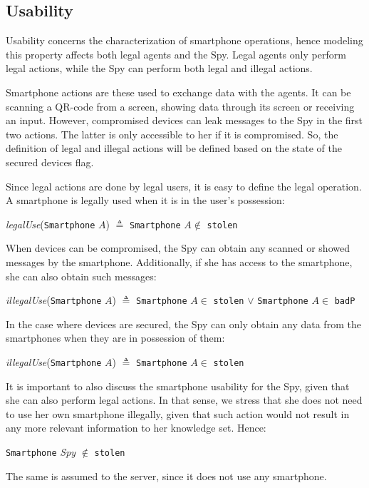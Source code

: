\subsection{Usability}
\label{ssec:usability}
Usability concerns the characterization of smartphone operations, hence modeling this property affects both legal agents and the Spy. Legal agents only perform legal actions, while the Spy can perform both legal and illegal actions.

Smartphone actions are these used to exchange data with the agents. It can be scanning a QR-code from a screen, showing data through its screen or receiving an input. However, compromised devices can leak messages to the Spy in the first two actions. The latter is only accessible to her if it is compromised. So, the definition of legal and illegal actions will be defined based on the state of the secured devices flag.

Since legal actions are done by legal users, it is easy to define the legal operation. A smartphone is legally used when it is in the user's possession:
%
\begin{center}
  \textit{legalUse}(\texttt{Smartphone} $A$) $\triangleq$ \texttt{Smartphone} $A \notin$ \texttt{stolen}
\end{center}
%
When devices can be compromised, the Spy can obtain any scanned or showed messages by the smartphone. Additionally, if she has access to the smartphone, she can also obtain such messages:
% 
\begin{center}
  \textit{illegalUse}(\texttt{Smartphone} $A$) $\triangleq$ \texttt{Smartphone} $A \in$ \texttt{stolen} $\vee$ \texttt{Smartphone} $A \in$ \texttt{badP}
\end{center}
% 
In the case where devices are secured, the Spy can only obtain any data from the smartphones when they are in possession of them:
%
\begin{center}
  \textit{illegalUse}(\texttt{Smartphone} $A$) $\triangleq$ \texttt{Smartphone} $A \in$ \texttt{stolen}
\end{center}
%
It is important to also discuss the smartphone usability for the Spy, given that she can also perform legal actions. In that sense, we stress that she does not need to use her own smartphone illegally, given that such action would not result in any more relevant information to her knowledge set. Hence:
%
\begin{center}
  \texttt{Smartphone} \textit{Spy} $\notin$ \texttt{stolen}
\end{center}
%
The same is assumed to the server, since it does not use any smartphone.




